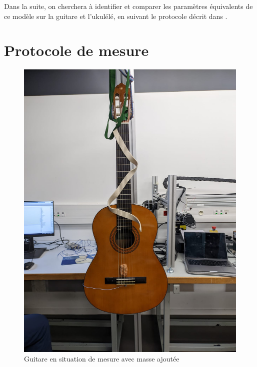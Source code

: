 \documentclass[atiam, article]{rapport} %
\begin{document}
Dans la suite, on cherchera à identifier et comparer les paramètres équivalents de ce modèle sur la guitare et l'ukulélé, en suivant le protocole décrit dans \cite{10.1121/1.384814}.

\section{Protocole de mesure}

\begin{figure}
  \begin{center}
    \includegraphics[width=\textwidth/4]{cordes/guitare.jpg}
  \end{center}
  \caption{Guitare en situation de mesure avec masse ajoutée}
  \label{fig:photo-guitare}
\end{figure}
\end{document}
